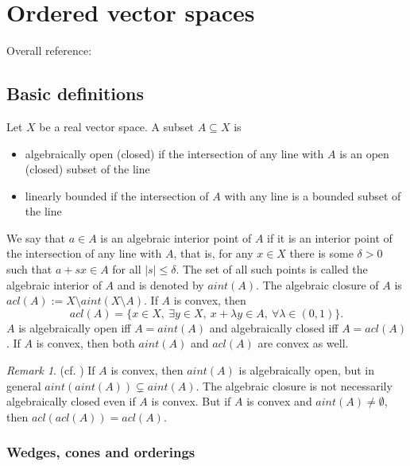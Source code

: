 \documentclass[12pt]{article}
\theoremstyle{remark}
\newtheorem{rem}{Remark}
\newcommand{\<}{\langle}
\begin{document}
\section{Ordered vector spaces }

Overall reference:  \cite{jameson}

\subsection{Basic definitions}

Let $X$ be a real vector space. A subset $A\subseteq X$ is 
\begin{itemize}
\item algebraically open (closed) if the intersection of any line with $A$ is an open (closed) subset of the line
\item linearly bounded if the intersection of $A$ with any line is  a bounded subset of the line
\end{itemize}
We say that $a\in A$ is an algebraic interior point of $A$ if it is an interior point of the intersection of any line with $A$, that is, 
for any $x\in X$ there is some $\delta>0$ such that $a+sx\in A$ for all $|s|\le \delta$. 
 The set of all such points is called the algebraic interior of $A$ and is denoted by $aint(A)$. The algebraic closure of $A$ is $acl(A):=X\setminus aint(X\setminus A)$.
If $A$ is convex, then
\[
acl(A)=\{x\in X,\ \exists y\in X,\ x+\lambda y\in A,\ \forall \lambda\in (0,1)\}.
\]
$A$ is algebraically open iff $A=aint(A)$ and algebraically closed iff $A=acl(A)$. If $A$ is convex, then both $aint(A)$ and $acl(A)$ are convex as well.

\begin{rem} (cf. \cite[\S 16]{kothe}) 
If $A$ is convex, then $aint(A)$ is algebraically open, but  in general $aint(aint(A))\subsetneq aint(A)$. The algebraic closure is not necessarily algebraically closed even if $A$ is convex. But if $A$ is convex and $aint(A)\ne \emptyset$, then $acl(acl(A))=acl(A)$. \end{rem}


\subsubsection*{Wedges, cones and orderings}
\end{document}
